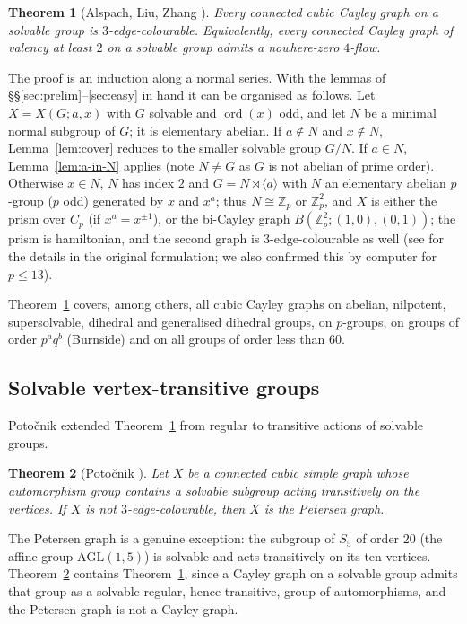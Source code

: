 \documentclass[11pt,a4paper]{article}
\newtheorem{theorem}{Theorem}[section]
\theoremstyle{definition}
\theoremstyle{remark}
\newcommand{\ord}{\operatorname{ord}}
\newcommand{\ZZ}{\mathbb{Z}}
\newcommand{\X}[3]{X(#1;#2,#3)}
\begin{document}
\begin{theorem}[Alspach, Liu, Zhang \cite{ALZ96}]\label{thm:ALZ}
Every connected cubic Cayley graph on a solvable group is $3$-edge-colourable.  Equivalently, every connected Cayley graph of valency at least $2$ on a solvable group admits a nowhere-zero $4$-flow.
\end{theorem}

The proof is an induction along a normal series.  With the lemmas of \S\S\ref{sec:prelim}--\ref{sec:easy} in hand it can be organised as follows.  Let $X=\X{G}{a}{x}$ with $G$ solvable and $\ord(x)$ odd, and let $N$ be a minimal normal subgroup of $G$; it is elementary abelian.  If $a\notin N$ and $x\notin N$, Lemma~\ref{lem:cover} reduces to the smaller solvable group $G/N$.  If $a\in N$, Lemma~\ref{lem:a-in-N} applies (note $N\ne G$ as $G$ is not abelian of prime order).  Otherwise $x\in N$, $N$ has index $2$ and $G=N\rtimes\langle a\rangle$ with $N$ an elementary abelian $p$-group ($p$ odd) generated by $x$ and $x^a$; thus $N\cong\ZZ_p$ or $\ZZ_p^2$, and $X$ is either the prism over $C_p$ (if $x^a=x^{\pm1}$), or the bi-Cayley graph $B(\ZZ_p^2;(1,0),(0,1))$; the prism is hamiltonian, and the second graph is $3$-edge-colourable as well (see \cite{ALZ96} for the details in the original formulation; we also confirmed this by computer for $p\le 13$).

Theorem~\ref{thm:ALZ} covers, among others, all cubic Cayley graphs on abelian, nilpotent, supersolvable, dihedral and generalised dihedral groups, on $p$-groups, on groups of order $p^aq^b$ (Burnside) and on all groups of order less than $60$.

\subsection{Solvable vertex-transitive groups}
Poto\v{c}nik extended Theorem~\ref{thm:ALZ} from regular to transitive actions of solvable groups.

\begin{theorem}[Poto\v{c}nik \cite{Potocnik04}]\label{thm:potocnik}
Let $X$ be a connected cubic simple graph whose automorphism group contains a solvable subgroup acting transitively on the vertices.  If $X$ is not $3$-edge-colourable, then $X$ is the Petersen graph.
\end{theorem}

The Petersen graph is a genuine exception: the subgroup of $S_5$ of order $20$ (the affine group $\mathrm{AGL}(1,5)$) is solvable and acts transitively on its ten vertices.  Theorem~\ref{thm:potocnik} contains Theorem~\ref{thm:ALZ}, since a Cayley graph on a solvable group admits that group as a solvable regular, hence transitive, group of automorphisms, and the Petersen graph is not a Cayley graph.
\end{document}
